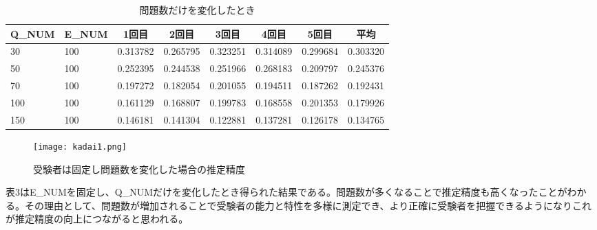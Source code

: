 \documentclass[12pt]{jarticle}
\begin{document}
\begin{table}[H]
\centering
\caption{問題数だけを変化したとき}
\begin{tabular}{ll|lllll|l}
\hline
\multicolumn{1}{c}{Q\_NUM} & \multicolumn{1}{c|}{E\_NUM} & \multicolumn{1}{c}{1回目} & \multicolumn{1}{c}{2回目} & \multicolumn{1}{c}{3回目} & \multicolumn{1}{c}{4回目} & \multicolumn{1}{c|}{5回目} & \multicolumn{1}{c|}{平均} \\ \hline
30                         & 100                         & 0.313782                & 0.265795                & 0.323251                & 0.314089                & 0.299684                 & 0.303320                \\
50                         & 100                         & 0.252395                & 0.244538                & 0.251966                & 0.268183                & 0.209797                 & 0.245376                \\
70                         & 100                         & 0.197272                & 0.182054                & 0.201055                & 0.194511                & 0.187262                 & 0.192431                \\
100                        & 100                         & 0.161129                & 0.168807                & 0.199783                & 0.168558                & 0.201353                 & 0.179926                \\
150                        & 100                         & 0.146181                & 0.141304                & 0.122881                & 0.137281                & 0.126178                 & 0.134765                \\ \hline
\end{tabular}
\end{table}
\begin{figure}[H]
 \centering
 \texttt{[image: kadai1.png]}
 \caption{受験者は固定し問題数を変化した場合の推定精度}
\end{figure}
表3はE\_NUMを固定し、Q\_NUMだけを変化したとき得られた結果である。問題数が多くなることで推定精度も高くなったことがわかる。その理由として、問題数が増加されることで受験者の能力と特性を多様に測定でき、より正確に受験者を把握できるようになりこれが推定精度の向上につながると思われる。
\end{document}
